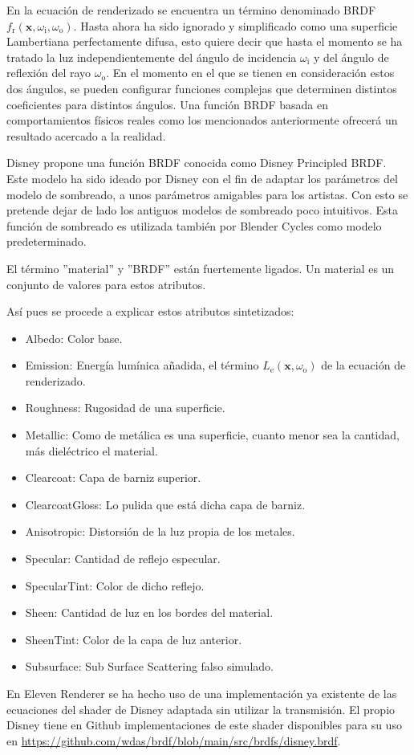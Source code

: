 En la ecuación de renderizado se encuentra un término denominado BRDF $f_{\text{r}}(\mathbf {x} ,\omega _{\text{i}},\omega _{\text{o}})$. Hasta ahora ha sido ignorado y simplificado como una superficie Lambertiana perfectamente difusa, esto quiere decir que hasta el momento se ha tratado la luz independientemente del ángulo de incidencia $\omega _{\text{i}}$ y del ángulo de reflexión del rayo $\omega _{\text{o}}$. En el momento en el que se tienen en consideración estos dos ángulos, se pueden configurar funciones complejas que determinen distintos coeficientes para distintos ángulos. Una función BRDF basada en comportamientos físicos reales como los mencionados anteriormente ofrecerá un resultado acercado a la realidad. 
	
Disney propone una función BRDF conocida como Disney Principled BRDF\cite{burley2012physically}. Este modelo ha sido ideado por Disney con el fin de adaptar los parámetros del modelo de sombreado, a unos parámetros amigables para los artistas. Con esto se pretende dejar de lado los antiguos modelos de sombreado poco intuitivos. Esta función de sombreado es utilizada también por Blender Cycles como modelo predeterminado.
	
El término ''material'' y ''BRDF'' están fuertemente ligados. Un material es un conjunto de valores para estos atributos.
		
Así pues se procede a explicar estos atributos sintetizados:

\begin{itemize}

	\item Albedo: Color base.
	\item Emission: Energía lumínica añadida, el término $L_{\text{e}}(\mathbf {x} ,\omega _{\text{o}})$ de la ecuación de renderizado.
	\item Roughness: Rugosidad de una superficie.
	\item Metallic: Como de metálica es una superficie, cuanto menor sea la cantidad, más dieléctrico el material.
	\item Clearcoat: Capa de barniz superior.
	\item ClearcoatGloss: Lo pulida que está dicha capa de barniz.
	\item Anisotropic: Distorsión de la luz propia de los metales.
	\item Specular: Cantidad de reflejo especular.
	\item SpecularTint: Color de dicho reflejo.
	\item Sheen: Cantidad de luz en los bordes del material.
	\item SheenTint: Color de la capa de luz anterior.
	\item Subsurface: Sub Surface Scattering falso simulado.
	
\end{itemize}

En Eleven Renderer se ha hecho uso de una implementación ya existente\cite{knightcrawler25} de las ecuaciones del shader de Disney adaptada sin utilizar la transmisión. El propio Disney tiene en Github implementaciones de este shader disponibles para su uso en \url{https://github.com/wdas/brdf/blob/main/src/brdfs/disney.brdf}.
	
